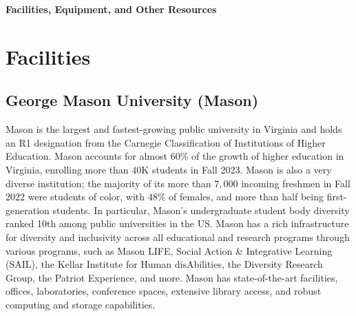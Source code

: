 \documentclass[11pt]{article}
\newcommand{\alert}[1]{{\color{blue}{#1}}}
\begin{document}
\begin{center}
{\Large \textbf{Facilities, Equipment, and Other Resources}}
\end{center}


\section*{Facilities}

\subsection*{George Mason University (Mason)} Mason is the largest and fastest-growing public university in Virginia and holds an R1 designation from the Carnegie Classification of Institutions of Higher Education. Mason accounts for almost $60\%$ of the growth of higher education in Virginia, enrolling more than  $40$K students in Fall 2023. Mason is also a very diverse institution; the majority of its more than $7,000$ incoming freshmen in Fall 2022 were students of color, with $48\%$ of females, and more than half being first-generation students. In particular, Mason's undergraduate student body diversity ranked 10th among public universities in the US. Mason has a rich infrastructure for diversity and inclusivity across all educational and research programs through various programs, such as Mason LIFE, Social Action \& Integrative Learning (SAIL), the Kellar Institute for Human disAbilities, the Diversity Research Group, the Patriot Experience, and more. Mason has state-of-the-art facilities, offices, laboratories,  conference spaces, extensive library access, and robust computing and storage capabilities.

\alert{The PIs and their labs reside in Mason's College of Science (PI Agnarsson) and College of Engineering and Computing (PIs Nguyen and Liu). Mason's College of Science has more than $5,000$ undergraduate and graduate students and its College of Enginering and Computing houses close to $9,000$. The two colleges are among the largest at Mason and the primary factor behind Mason being the largest producer of tech talent in Northern Virginia.}


\end{document}
